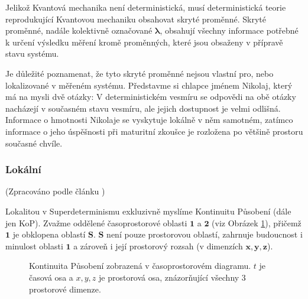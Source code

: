 Jelikož Kvantová mechanika není deterministická, musí deterministická teorie reprodukující Kvantovou mechaniku obsahovat skryté proměnné. Skryté proměnné, nadále kolektivně označované $\bm{\lambda}$, obsahují všechny informace potřebné k určení výsledku měření kromě  proměnných, které jsou obsaženy v přípravě stavu systému.

Je důležité poznamenat, že tyto skryté proměnné nejsou vlastní pro, nebo lokalizované v měřeném systému. Představme si chlapce jménem Nikolaj, který má na mysli dvě otázky:  V deterministickém vesmíru se odpovědi na obě otázky nacházejí v současném stavu vesmíru, ale jejich dostupnost je velmi odlišná. Informace o hmotnosti Nikolaje se vyskytuje lokálně v něm samotném, zatímco informace o jeho úspěšnosti při maturitní zkoušce je rozložena po většině prostoru současné chvíle.

\subsubsection{Lokální}
(Zpracováno podle článku \cite{CoA})

Lokalitou v Superdeterminismu exkluzivně myslíme Kontinuitu Působení (dále jen KoP). Zvažme oddělené časoprostorové oblasti $\bm{1}$ a $\bm{2}$ (viz Obrázek \ref{fig:7}), přičemž $\bm{1}$ je obklopena  oblastí $\bm{S}$. $\bm{S}$ není pouze prostorovou oblastí, zahrnuje budoucnost i minulost oblasti $\bm{1}$ a zároveň i její prostorový rozsah (v dimenzích $\bm{x,y,z}$).

\begin{figure}[ht]

    \centering

    \caption{\label{fig:7}Kontinuita Působení zobrazená v časoprostorovém diagramu. $t$ je časová osa a $x,y,z$ je prostorová osa, znázorňující všechny 3 prostorové dimenze.}
\end{figure}

